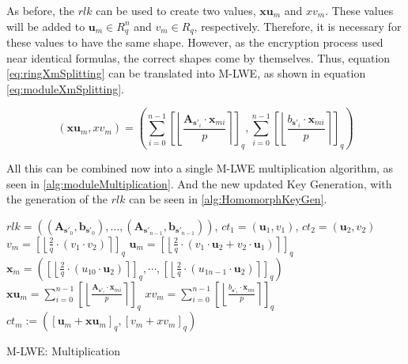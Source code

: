 As before, the $rlk$ can be used to create two values, $\textbf{xu}_m$ and $xv_m$. These values will be added to $\textbf{u}_m \in R^n_q$ and $v_m \in R_q$, respectively. Therefore, it is necessary for these values to have the same shape. However, as the encryption process used near identical formulas, the correct shapes come by themselves. Thus, equation \ref{eq:ringXmSplitting} can be translated into M-LWE, as shown in equation \ref{eq:moduleXmSplitting}. 

\begin{equation}
  (\textbf{xu}_m, xv_m) = \left(\sum_{i=0}^{n-1}\left[\left\lfloor\frac{\textbf{A}_{\textbf{s}'_i} \cdot \textbf{x}_{mi}}{p}  \right\rceil \right]_q, \sum_{i=0}^{n-1}\left[\left\lfloor \frac{b_{\textbf{s}'_i} \cdot \textbf{x}_{mi}}{p}  \right\rceil \right]_q\right)
  \label{eq:moduleXmSplitting}
\end{equation}

All this can be combined now into a single M-LWE multiplication algorithm, as seen in \ref{alg:moduleMultiplication}. And the new updated Key Generation, with the generation of the $rlk$ can be seen in \ref{alg:HomomorphKeyGen}.

\begin{algorithm}[htb]
  \begin{algorithmic}[1]
    \REQUIRE $rlk=((\textbf{A}_{\textbf{s}'_0}, \textbf{b}_{\textbf{s}'_0}), \ldots ,(\textbf{A}_{\textbf{s}'_{n-1}}, \textbf{b}_{\textbf{s}'_{n-1}}))$, $ct_1 = (\textbf{u}_1, v_1)$, $ct_2 = (\textbf{u}_2, v_2)$
    \STATE $v_m = \left[\left\lfloor \frac{2}{q}\cdot (v_1 \cdot v_2)\right\rceil\right] _q $
    \STATE $\textbf{u}_m = \left[\left\lfloor \frac{2}{q}\cdot(v_1 \cdot \textbf{u}_2 + v_2 \cdot \textbf{u}_1)\right\rceil\right] _q$
    \STATE $\textbf{x}_m = \left(\left[\left\lfloor \frac{2}{q}\cdot(u_{10} \cdot \textbf{u}_2)\right\rceil\right]_q,\cdots, \left[\left\lfloor \frac{2}{q}\cdot(u_{1n-1} \cdot \textbf{u}_2)\right\rceil\right]_q\right) $
    \STATE $\textbf{xu}_m = \sum_{i=0}^{n-1}\left[\left\lfloor\frac{\textbf{A}_{\textbf{s}'_i} \cdot \textbf{x}_{mi}}{p}  \right\rceil \right]_q$
    \STATE $xv_m = \sum_{i=0}^{n-1}\left[\left\lfloor \frac{b_{\textbf{s}'_i} \cdot \textbf{x}_{mi}}{p}  \right\rceil \right]_q$
    \RETURN $ct_m:=(\left[\textbf{u}_m + \textbf{xu}_m\right]_q , \left[v_m + xv_m\right]_q )$
  \end{algorithmic}
  \caption{M-LWE: Multiplication}
  \label{alg:moduleMultiplication}
\end{algorithm}


